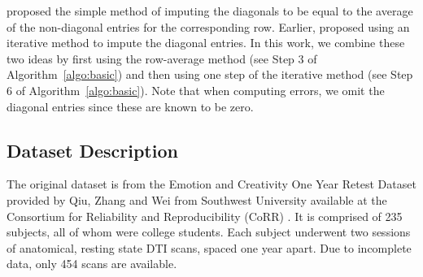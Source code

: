\documentclass[10pt,letterpaper]{article}
\newcommand{\Ex}{\mathbb{E}}
\renewcommand{\hat}{\widehat}
\begin{document}
\citet{marchette2011vertex}  proposed the simple method of imputing the diagonals to be equal to the average of the non-diagonal entries for the corresponding row.
Earlier, \citet{scheinerman2010modeling} proposed using an iterative method to impute the diagonal entries.
In this work, we combine these two ideas by first using the row-average method  (see Step 3 of Algorithm~\ref{algo:basic}) and then using one step of the iterative method (see Step 6 of Algorithm~\ref{algo:basic}).
Note that when computing errors, we omit the diagonal entries since these are known to be zero.


\subsection{Dataset Description}
\label{section:data}
The original dataset is from the Emotion and Creativity One Year Retest Dataset provided by Qiu, Zhang and Wei from Southwest University available at the Consortium for Reliability and Reproducibility (CoRR) \citep{zuo2014open, gorgolewski2015high}. It is comprised of 235 subjects, all of whom were college students. Each subject underwent two sessions of anatomical, resting state DTI scans, spaced one year apart. Due to incomplete data, only 454 scans are available.
\end{document}

